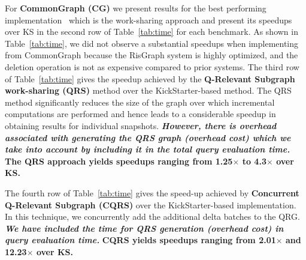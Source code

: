 For \textbf{CommonGraph (CG)} we present results for the best performing implementation~\cite{CommonGraph} which is the work-sharing approach and present its speedups over KS in the second row of Table~\ref{tab:time} for each benchmark. As shown in Table~\ref{tab:time}, we did not observe a substantial speedups when implementing from CommonGraph because the RisGraph system is highly optimized, and the deletion operation is not as expensive compared to prior systems. The third row of Table~\ref{tab:time} gives the speedup achieved by the \textbf{Q-Relevant Subgraph work-sharing (QRS)} method over the KickStarter-based method. The QRS method significantly reduces the size of the graph over which incremental computations are performed and hence leads to a considerable speedup in obtaining results for individual snapshots. \textbf{\emph{However, there is overhead associated with generating the QRS graph (overhead cost) which we take into account by including it in the total query evaluation time. }}\textbf{The QRS approach yields speedups ranging from 1.25$\times$ to 4.3$\times$ over KS.}

The fourth row of Table~\ref{tab:time} gives the speed-up achieved by \textbf{Concurrent Q-Relevant Subgraph (CQRS)} over the KickStarter-based implementation. In this technique, we concurrently add the additional delta batches to the QRG. \textbf{\emph{We have included the time for QRS generation (overhead cost) in query evaluation time.}} \textbf{CQRS yields speedups ranging from 2.01$\times$ and 12.23$\times$ over KS.}

